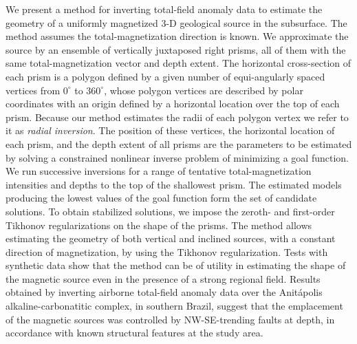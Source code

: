 \begin{summary}
We present a method for inverting total-field anomaly data to estimate the geometry of 
a uniformly magnetized 3-D geological source in the subsurface. The method assumes 
the total-magnetization direction is known. 
We approximate the source by an ensemble of vertically juxtaposed right prisms, all of them with the same total-magnetization vector and depth extent. 
The horizontal cross-section of each prism is a polygon defined by a given number of
equi-angularly spaced vertices from $0^{\circ}$ to $360^{\circ}$,  whose polygon vertices 
are described by polar coordinates with an origin defined by a horizontal location 
over the top of each prism. 
Because our method estimates the radii of each polygon vertex  we refer to it as 
\textit{radial inversion}.
The position of these vertices, the horizontal location of each prism, and the depth extent of all prisms are the parameters to be estimated by solving a constrained nonlinear inverse problem of minimizing a goal function. 
We run successive inversions for a range of tentative total-magnetization intensities 
and depths to the top of the shallowest prism. The estimated models producing 
the lowest values of the goal function form the set of candidate solutions.
To obtain stabilized solutions, we impose the zeroth- and first-order Tikhonov 
regularizations on the shape of the prisms. The method allows estimating the geometry 
of both vertical and inclined sources, with a constant direction of magnetization, 
by using the Tikhonov regularization. 
Tests with synthetic data show that the method can be of utility in estimating the shape of the magnetic source even in the presence of a strong regional field.
Results obtained by inverting airborne total-field anomaly data over the 
Anit{\'a}polis alkaline-carbonatitic complex, in southern Brazil, 
suggest that the emplacement of the magnetic sources was controlled by NW-SE-trending 
faults at depth, in accordance with known structural features at the study area.
\end{summary}